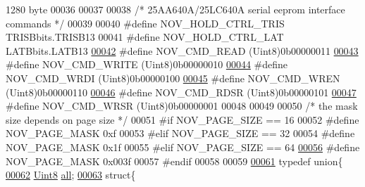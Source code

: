 \begin{DoxyCode}
{       1280 byte}
00036 
00037 
00038 \textcolor{comment}{/* 25AA640A/25LC640A serial eeprom interface commands */}
00039 
00040 \textcolor{preprocessor}{#define NOV\_HOLD\_CTRL\_TRIS                                     TRISBbits.TRISB13}
00041 \textcolor{preprocessor}{#define NOV\_HOLD\_CTRL\_LAT                                      LATBbits.LATB13}
\hypertarget{a00029_source_l00042}{}\hyperlink{a00029_a9d4dca4a65e8cabd1d733922725309e4}{00042} \textcolor{preprocessor}{#define NOV\_CMD\_READ                                          (Uint8)0b00000011}
\hypertarget{a00029_source_l00043}{}\hyperlink{a00029_a031aab76ddb1258273541a65d70acbe1}{00043} \textcolor{preprocessor}{#define NOV\_CMD\_WRITE                                         (Uint8)0b00000010}
\hypertarget{a00029_source_l00044}{}\hyperlink{a00029_a3924df5fbf1e1ff642a9bde06e17b69d}{00044} \textcolor{preprocessor}{#define NOV\_CMD\_WRDI                                          (Uint8)0b00000100}
\hypertarget{a00029_source_l00045}{}\hyperlink{a00029_acc9f91a7c7d40a32755560dda080cf98}{00045} \textcolor{preprocessor}{#define NOV\_CMD\_WREN                                          (Uint8)0b00000110}
\hypertarget{a00029_source_l00046}{}\hyperlink{a00029_a55309727a3055fdebf8df6e9d0f72fea}{00046} \textcolor{preprocessor}{#define NOV\_CMD\_RDSR                                          (Uint8)0b00000101}
\hypertarget{a00029_source_l00047}{}\hyperlink{a00029_a8e00cafebecc8bdde750bb02e504b124}{00047} \textcolor{preprocessor}{#define NOV\_CMD\_WRSR                                          (Uint8)0b00000001}
00048 
00049 
00050 \textcolor{comment}{/* the mask size depends on page size */}
00051 \textcolor{preprocessor}{#if   NOV\_PAGE\_SIZE == 16}
00052 \textcolor{preprocessor}{#define NOV\_PAGE\_MASK         0xf}
00053 \textcolor{preprocessor}{#elif NOV\_PAGE\_SIZE == 32}
00054 \textcolor{preprocessor}{#define NOV\_PAGE\_MASK         0x1f}
00055 \textcolor{preprocessor}{#elif NOV\_PAGE\_SIZE == 64}
\hypertarget{a00029_source_l00056}{}\hyperlink{a00029_a9eddef3795715df4279af5e0ddd92a87}{00056} \textcolor{preprocessor}{#define NOV\_PAGE\_MASK         0x003f}
00057 \textcolor{preprocessor}{#endif}
00058 
00059 
\hypertarget{a00029_source_l00061}{}\hyperlink{a00029}{00061} \textcolor{keyword}{typedef} \textcolor{keyword}{union}\{
\hypertarget{a00029_source_l00062}{}\hyperlink{a00029_a2625a533c46821f49caaf4dcc77316b1}{00062}     \hyperlink{a00072_af84840501dec18061d18a68c162a8fa2}{Uint8} \hyperlink{a00029_a2625a533c46821f49caaf4dcc77316b1}{all};
\hypertarget{a00029_source_l00063}{}\hyperlink{a00029}{00063}     \textcolor{keyword}{struct}\{

\end{DoxyCode}
